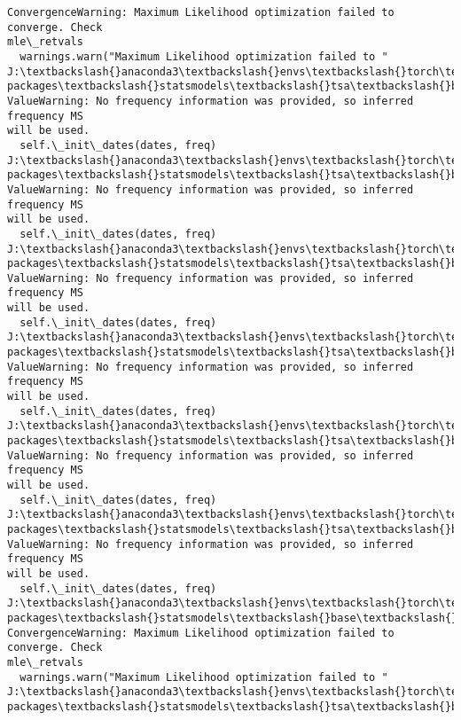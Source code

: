 \documentclass[11pt]{article}
\begin{document}
\begin{Verbatim}[commandchars=\\\{\}]
ConvergenceWarning: Maximum Likelihood optimization failed to converge. Check
mle\_retvals
  warnings.warn("Maximum Likelihood optimization failed to "
J:\textbackslash{}anaconda3\textbackslash{}envs\textbackslash{}torch\textbackslash{}Lib\textbackslash{}site-packages\textbackslash{}statsmodels\textbackslash{}tsa\textbackslash{}base\textbackslash{}tsa\_model.py:473:
ValueWarning: No frequency information was provided, so inferred frequency MS
will be used.
  self.\_init\_dates(dates, freq)
J:\textbackslash{}anaconda3\textbackslash{}envs\textbackslash{}torch\textbackslash{}Lib\textbackslash{}site-packages\textbackslash{}statsmodels\textbackslash{}tsa\textbackslash{}base\textbackslash{}tsa\_model.py:473:
ValueWarning: No frequency information was provided, so inferred frequency MS
will be used.
  self.\_init\_dates(dates, freq)
J:\textbackslash{}anaconda3\textbackslash{}envs\textbackslash{}torch\textbackslash{}Lib\textbackslash{}site-packages\textbackslash{}statsmodels\textbackslash{}tsa\textbackslash{}base\textbackslash{}tsa\_model.py:473:
ValueWarning: No frequency information was provided, so inferred frequency MS
will be used.
  self.\_init\_dates(dates, freq)
J:\textbackslash{}anaconda3\textbackslash{}envs\textbackslash{}torch\textbackslash{}Lib\textbackslash{}site-packages\textbackslash{}statsmodels\textbackslash{}tsa\textbackslash{}base\textbackslash{}tsa\_model.py:473:
ValueWarning: No frequency information was provided, so inferred frequency MS
will be used.
  self.\_init\_dates(dates, freq)
J:\textbackslash{}anaconda3\textbackslash{}envs\textbackslash{}torch\textbackslash{}Lib\textbackslash{}site-packages\textbackslash{}statsmodels\textbackslash{}tsa\textbackslash{}base\textbackslash{}tsa\_model.py:473:
ValueWarning: No frequency information was provided, so inferred frequency MS
will be used.
  self.\_init\_dates(dates, freq)
J:\textbackslash{}anaconda3\textbackslash{}envs\textbackslash{}torch\textbackslash{}Lib\textbackslash{}site-packages\textbackslash{}statsmodels\textbackslash{}tsa\textbackslash{}base\textbackslash{}tsa\_model.py:473:
ValueWarning: No frequency information was provided, so inferred frequency MS
will be used.
  self.\_init\_dates(dates, freq)
J:\textbackslash{}anaconda3\textbackslash{}envs\textbackslash{}torch\textbackslash{}Lib\textbackslash{}site-packages\textbackslash{}statsmodels\textbackslash{}base\textbackslash{}model.py:607:
ConvergenceWarning: Maximum Likelihood optimization failed to converge. Check
mle\_retvals
  warnings.warn("Maximum Likelihood optimization failed to "
J:\textbackslash{}anaconda3\textbackslash{}envs\textbackslash{}torch\textbackslash{}Lib\textbackslash{}site-packages\textbackslash{}statsmodels\textbackslash{}tsa\textbackslash{}base\textbackslash{}tsa\_model.py:473:

\end{Verbatim}
\end{document}
